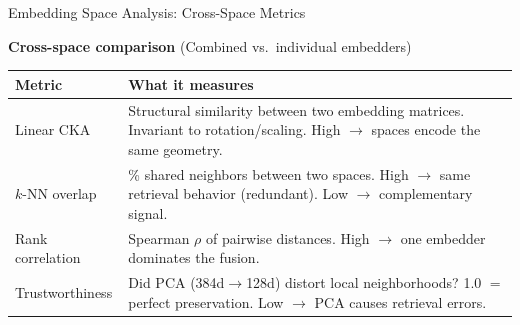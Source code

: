 \documentclass[aspectratio=169,10pt]{beamer}
\begin{document}
\begin{frame}{Embedding Space Analysis: Cross-Space Metrics}

  \textbf{\textcolor{c3}{Cross-space comparison}} {\small(Combined vs.\ individual embedders)}

  \vspace{0.5em}
  {\scriptsize
  \renewcommand{\arraystretch}{1.25}
  \begin{tabular}{p{3.0cm}p{10.5cm}}
    \toprule
    \textbf{Metric} & \textbf{What it measures} \\
    \midrule
    Linear CKA
      & Structural similarity between two embedding matrices.
        Invariant to rotation/scaling.
        High $\to$ spaces encode the same geometry. \\
    $k$-NN overlap
      & \% shared neighbors between two spaces.
        High $\to$ same retrieval behavior (redundant).
        Low $\to$ complementary signal. \\
    Rank correlation
      & Spearman $\rho$ of pairwise distances.
        High $\to$ one embedder dominates the fusion. \\
    Trustworthiness
      & Did PCA (384d$\to$128d) distort local neighborhoods?
        1.0 $=$ perfect preservation.
        Low $\to$ PCA causes retrieval errors. \\
    \bottomrule
  \end{tabular}}




\end{frame}
\end{document}

